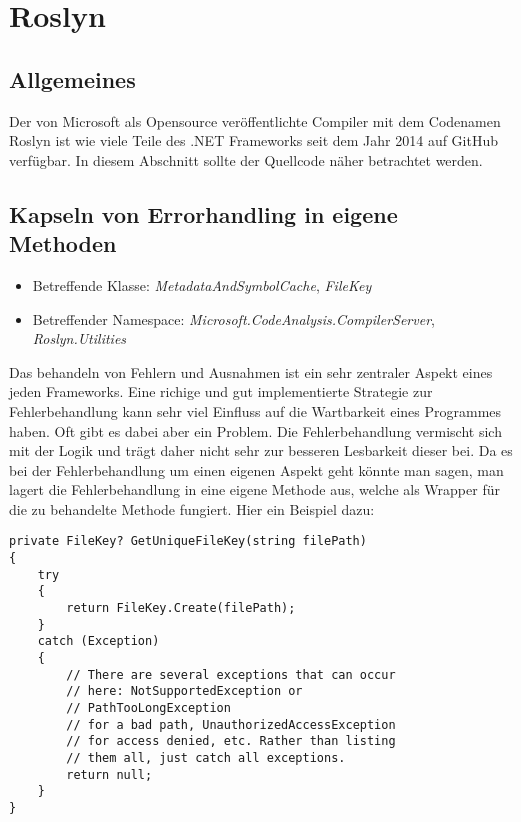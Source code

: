\section{Roslyn}
\subsection{Allgemeines}
Der von Microsoft als Opensource veröffentlichte Compiler mit dem Codenamen Roslyn ist wie viele Teile des .NET Frameworks seit dem Jahr 2014 auf GitHub verfügbar. In diesem Abschnitt sollte der Quellcode näher betrachtet werden. 

\subsection{Kapseln von Errorhandling in eigene Methoden}
\begin{itemize}
	\item Betreffende Klasse: \textit{MetadataAndSymbolCache}, \textit{FileKey}
	\item Betreffender Namespace: \textit{Microsoft.CodeAnalysis.CompilerServer}, \textit{Roslyn.Utilities}
\end{itemize}

Das behandeln von Fehlern und Ausnahmen ist ein sehr zentraler Aspekt eines jeden Frameworks. Eine richige und gut implementierte Strategie zur Fehlerbehandlung kann sehr viel Einfluss auf die Wartbarkeit eines Programmes haben. Oft gibt es dabei aber ein Problem. Die Fehlerbehandlung vermischt sich mit der Logik und trägt daher nicht sehr zur besseren Lesbarkeit dieser bei. Da es bei der Fehlerbehandlung um einen eigenen Aspekt geht könnte man sagen, man lagert die Fehlerbehandlung in eine eigene Methode aus, welche als Wrapper für die zu behandelte Methode fungiert. Hier ein Beispiel dazu:

\begin{lstlisting}[language={[Sharp]C}, caption=Beispiele für getrennten Aspket der Fehlerbehandlung, label=lst:AspectedErrorhandling]
private FileKey? GetUniqueFileKey(string filePath)
{
	try
	{
		return FileKey.Create(filePath);
	}
	catch (Exception)
	{
		// There are several exceptions that can occur 
		// here: NotSupportedException or 
		// PathTooLongException
		// for a bad path, UnauthorizedAccessException 
		// for access denied, etc. Rather than listing
		// them all, just catch all exceptions.
		return null;
	}
}
\end{lstlisting}

